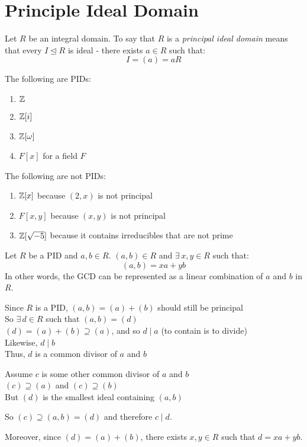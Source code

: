 \documentclass[letterpaper,12pt,fleqn]{article}
\newcommand{\ide}{\trianglelefteq}
\begin{document}
\section*{Principle Ideal Domain}

\begin{definition}[PID]
  Let $R$ be an integral domain. To say that $R$ is a
  \emph{principal ideal domain} means that every $I\ide R$ is ideal - there
  exists $a\in R$ such that:
  \[I=(a)=aR\]
\end{definition}

\begin{example}
  The following are PIDs:
  \begin{enumerate}
  \item $\mathbb{Z}$
  \item $\mathbb{Z}[i]$
  \item $\mathbb{Z}[\omega]$
  \item $F[x]$ for a field $F$
  \end{enumerate}

  The following are not PIDs:
  \begin{enumerate}
  \item $\mathbb{Z}[x]$ because $(2,x)$ is not principal
  \item $F[x,y]$ because $(x,y)$ is not principal
  \item $\mathbb{Z}[\sqrt{-5}]$ because it contains irreducibles that are not prime
  \end{enumerate}
\end{example}

\begin{lemma}
  Let $R$ be a PID and $a,b\in R$. $(a,b)\in R$ and $\exists\,x,y\in R$ such
  that:
  \[(a,b)=xa+yb\]
  In other words, the GCD can be represented as a linear combination of $a$ and
  $b$ in $R$.
\end{lemma}

\begin{theproof}
  Since $R$ is a PID, $(a,b)=(a)+(b)$ should still be principal \\
  So $\exists\,d\in R$ such that $(a,b)=(d)$ \\
  $(d)=(a)+(b)\supseteq(a)$, and so $d\mid a$ (to contain is to divide) \\
  Likewise, $d\mid b$ \\
  Thus, $d$ is a common divisor of $a$ and $b$

  Assume $c$ is some other common divisor of $a$ and $b$ \\
  $(c)\supseteq(a)$ and $(c)\supseteq(b)$ \\
  But $(d)$ is the smallest ideal containing $(a,b)$
  
  So $(c)\supseteq(a,b)=(d)$ and therefore $c\mid d$.

  Moreover, since $(d)=(a)+(b)$, there exists $x,y\in R$ such that
  $d=xa+yb$.
\end{theproof}
\end{document}
